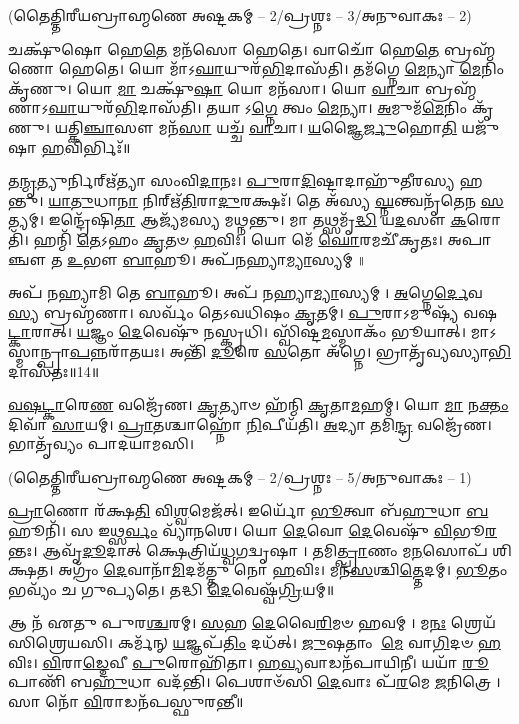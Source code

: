\centerline{\scriptsize (𑌤𑍈𑌤𑍍𑌤𑌿𑌰𑍀𑌯𑌬𑍍𑌰𑌾𑌹𑍍𑌮𑌣𑍇 𑌅𑌷𑍍𑌟𑌕𑌮𑍍 – 2/𑌪𑍍𑌰𑌶𑍍𑌨𑌃 – 3/𑌅𑌨𑍁𑌵𑌾𑌕𑌃 – 2)}
𑌚𑌕𑍍𑌷𑍁᳴𑌷𑍋 𑌹𑍇\-\ul{𑌤𑍇} 𑌮𑌨᳴𑌸𑍋 𑌹𑍇𑌤𑍇।
𑌵𑌾𑌚𑍋᳴ 𑌹𑍇\-\ul{𑌤𑍇} 𑌬𑍍𑌰𑌹𑍍𑌮᳴𑌣𑍋 𑌹𑍇𑌤𑍇।
𑌯𑍋 𑌮𑌾᳴𑌽\-\ul{𑌘𑌾}\-𑌯𑍁𑌰᳴\-\ul{𑌭𑌿}\-𑌦𑌾𑌸᳴𑌤𑌿।
𑌤𑌮᳴𑌗𑍍𑌨𑍇 \ul{𑌮𑍇}\-𑌨𑍍𑌯𑌾 \ul{𑌮𑍇}\-𑌨𑌿𑌂 𑌕𑍃᳴𑌣𑍁।
𑌯𑍋 \ul{𑌮𑌾} 𑌚𑌕𑍍𑌷𑍁᳴\-\ul{𑌷𑌾} 𑌯𑍋 𑌮𑌨᳴𑌸𑌾।
𑌯𑍋 \ul{𑌵𑌾}\-𑌚𑌾 𑌬𑍍𑌰𑌹𑍍𑌮᳴𑌣𑌾𑌽\-\ul{𑌘𑌾}\-𑌯𑍁𑌰᳴\-\ul{𑌭𑌿}\-𑌦𑌾𑌸᳴𑌤𑌿।
𑌤𑌯𑌾𑌽\-\ul{𑌗𑍍𑌨𑍇} 𑌤𑍍𑌵𑌂 \ul{𑌮𑍇}\-𑌨𑍍𑌯𑌾।
\-\ul{𑌅}\-𑌮𑍁𑌮᳴\-\ul{𑌮𑍇}\-𑌨𑌿𑌂 𑌕𑍃᳴𑌣𑍁।
𑌯𑌤𑍍𑌕𑌿\-\ul{𑌞𑍍𑌚𑌾}\-𑌸𑍗 𑌮𑌨᳴\-\ul{𑌸𑌾} 𑌯𑌚𑍍𑌚᳴ \ul{𑌵𑌾}\-𑌚𑌾।
\-\ul{𑌯}\-𑌜𑍍𑌞𑍈\-\ul{𑌰𑍍𑌜𑍁}\-𑌹𑍋\-\ul{𑌤𑌿} 𑌯𑌜𑍁᳴𑌷𑌾 \ul{𑌹}\-𑌵𑌿𑌰𑍍𑌭𑌿𑌃᳴॥

𑌤\-\ul{𑌨𑍍𑌮𑍃}\-𑌤𑍍𑌯𑍁𑌰𑍍𑌨𑌿𑌰𑍍\mbox{}𑌋᳴𑌤𑍍𑌯𑌾 𑌸𑌂𑌵𑌿\-\ul{𑌦𑌾}\-𑌨𑌃।
\-\ul{𑌪𑍁}\-𑌰𑌾\-\ul{𑌦𑌿}\-𑌷𑍍𑌟𑌾𑌦𑌾𑌹𑍁᳴𑌤𑍀𑌰𑌸𑍍𑌯 𑌹𑌨𑍍𑌤𑍁।
\-\ul{𑌯𑌾}\-\-\ul{𑌤𑍁}\-𑌧𑌾\-\ul{𑌨𑌾} 𑌨𑌿𑌰𑍍\mbox{}𑌋᳴\-\ul{𑌤𑌿}\-𑌰𑌾\-\ul{𑌦𑍁}\-𑌰𑌕𑍍𑌷𑌃᳴।
𑌤𑍇 𑌅᳴𑌸𑍍𑌯 \ul{𑌘𑍍𑌨}\-𑌨𑍍𑌤𑍍𑌵𑌨𑍃᳴𑌤𑍇𑌨 \ul{𑌸}\-𑌤𑍍𑌯𑌮𑍍।
𑌇𑌨𑍍𑌦𑍍𑌰𑍇᳴𑌷𑌿\-\ul{𑌤𑌾} 𑌆𑌜𑍍𑌯᳴𑌮𑌸𑍍𑌯 𑌮𑌥𑍍𑌨𑌨𑍍𑌤𑍁।
𑌮𑌾 𑌤𑌥𑍍𑌸𑌮𑍃᳴\-\ul{𑌦𑍍𑌧𑌿} 𑌯\-\ul{𑌦}\-𑌸𑍗 \ul{𑌕}\-𑌰𑍋𑌤𑌿᳴।
𑌹𑌨𑍍𑌮𑌿᳴ \ul{𑌤𑍇}\-𑌽𑌹𑌂 \ul{𑌕𑍃}\-𑌤𑍞 \ul{𑌹}\-𑌵𑌿𑌃।
𑌯𑍋 𑌮𑍇᳴ \ul{𑌘𑍋}\-𑌰𑌮𑌚𑍀᳴𑌕𑍃𑌤𑌃।
𑌅𑌪𑌾𑌞𑍍𑌚𑍗 𑌤 \ul{𑌉}\-𑌭𑍗 \ul{𑌬𑌾}\-𑌹𑍂।
𑌅𑌪᳴𑌨𑌹𑍍𑌯𑌾\-\ul{𑌮𑍍𑌯𑌾}\-𑌸𑍍𑌯𑌮𑍍॥

𑌅𑌪᳴ 𑌨𑌹𑍍𑌯𑌾𑌮𑌿 𑌤𑍇 \ul{𑌬𑌾}\-𑌹𑍂।
𑌅𑌪᳴ 𑌨𑌹𑍍𑌯𑌾\-\ul{𑌮𑍍𑌯𑌾}\-𑌸𑍍𑌯𑌮𑍍।
\-\ul{𑌅}\-𑌗𑍍𑌨𑍇\-\ul{𑌰𑍍𑌦𑍇}\-𑌵\-\ul{𑌸𑍍𑌯} 𑌬𑍍𑌰𑌹𑍍𑌮᳴𑌣𑌾।
𑌸𑌰𑍍𑌵𑌂᳴ 𑌤𑍇𑌽𑌵𑌧𑌿𑌷𑌂 \ul{𑌕𑍃}\-𑌤𑌮𑍍।
\-\ul{𑌪𑍁}\-𑌰𑌾𑌽𑌮𑍁𑌷𑍍𑌯᳴ 𑌵𑌷\-\ul{𑌟𑍍𑌕𑌾}\-𑌰𑌾𑌤𑍍।
\-\ul{𑌯}\-𑌜𑍍𑌞𑌂 \ul{𑌦𑍇}\-𑌵𑍇𑌷𑍁᳴ 𑌨𑌸𑍍𑌕𑍃𑌧𑌿।
𑌸𑍍𑌵𑌿᳴𑌷𑍍𑌟\-\ul{𑌮}\-𑌸𑍍𑌮𑌾𑌕𑌂᳴ 𑌭𑍂𑌯𑌾𑌤𑍍।
𑌮𑌾𑌽𑌸𑍍𑌮𑌾𑌨𑍍𑌪𑍍𑌰𑌾\-\ul{𑌪}\-𑌨𑍍𑌨\-𑌰𑌾᳴𑌤𑌯𑌃।
𑌅𑌨𑍍𑌤𑌿᳴ \ul{𑌦𑍂}\-𑌰𑍇 \ul{𑌸}\-𑌤𑍋 𑌅᳴𑌗𑍍𑌨𑍇।
𑌭𑍍𑌰𑌾𑌤𑍃᳴𑌵𑍍𑌯𑌸𑍍𑌯𑌾\-\ul{𑌭𑌿}\-𑌦𑌾𑌸᳴𑌤𑌃॥14॥

\-\ul{𑌵}\-\-\ul{𑌷}\-\-\ul{𑌟𑍍𑌕𑌾}\-𑌰𑍇\-\ul{𑌣} 𑌵𑌜𑍍𑌰𑍇᳴𑌣।
\-\ul{𑌕𑍃}\-𑌤𑍍𑌯𑌾𑍞 𑌹᳴𑌨𑍍𑌮𑌿 \ul{𑌕𑍃}\-𑌤𑌾\-\ul{𑌮}\-𑌹𑌮𑍍।
𑌯𑍋 \ul{𑌮𑌾} 𑌨\-\ul{𑌕𑍍𑌤𑌂} 𑌦𑌿𑌵𑌾᳴ \ul{𑌸𑌾}\-𑌯𑌮𑍍।
\-\ul{𑌪𑍍𑌰𑌾}\-𑌤𑌶𑍍𑌚𑌾𑌹𑍍𑌨𑍋᳴ \ul{𑌨𑌿}\-𑌪𑍀𑌯᳴𑌤𑌿।
\-\ul{𑌅}\-𑌦𑍍𑌯𑌾 𑌤𑌮𑌿᳴\-\ul{𑌨𑍍𑌦𑍍𑌰} 𑌵𑌜𑍍𑌰𑍇᳴𑌣।
𑌭𑌾𑌤𑍃᳴𑌵𑍍𑌯𑌂 𑌪𑌾𑌦𑌯𑌾𑌮𑌸𑌿।

\centerline{\scriptsize (𑌤𑍈𑌤𑍍𑌤𑌿𑌰𑍀𑌯𑌬𑍍𑌰𑌾𑌹𑍍𑌮𑌣𑍇 𑌅𑌷𑍍𑌟𑌕𑌮𑍍 – 2/𑌪𑍍𑌰𑌶𑍍𑌨𑌃 – 5/𑌅𑌨𑍁𑌵𑌾𑌕𑌃 – 1)}

\-\ul{𑌪𑍍𑌰𑌾}\-𑌣𑍋 𑌰᳴𑌕𑍍𑌷\-\ul{𑌤𑌿} 𑌵𑌿\-\ul{𑌶𑍍𑌵}\-𑌮𑍇𑌜᳴𑌤𑍍।
𑌇𑌰𑍍𑌯𑍋᳴ \ul{𑌭𑍂}\-𑌤𑍍𑌵𑌾 𑌬᳴\-\ul{𑌹𑍁}\-𑌧𑌾 \ul{𑌬}\-𑌹𑍂𑌨𑌿᳴।
𑌸 𑌇𑌥𑍍𑌸\-\ul{𑌰𑍍𑌵𑌂} 𑌵𑍍𑌯𑌾᳴𑌨𑌶𑍇।
𑌯𑍋 \ul{𑌦𑍇}\-𑌵𑍋 \ul{𑌦𑍇}\-𑌵𑍇𑌷𑍁᳴ \ul{𑌵𑌿}\-𑌭𑍂\-\ul{𑌰}\-𑌨𑍍𑌤𑌃।
𑌆𑌵𑍃᳴\-\ul{𑌦𑍂}\-𑌦𑌾𑌤𑍍 𑌕𑍍𑌷𑍇𑌤𑍍𑌰𑌿𑌯᳴\-\ul{𑌧𑍍𑌵}\-𑌗𑌦𑍍𑌵𑍃𑌷𑌾।
𑌤𑌮𑌿\-\ul{𑌤𑍍𑌪𑍍𑌰𑌾}\-𑌣𑌂 𑌮\-\ul{𑌨}\-𑌸𑍋𑌪᳴ 𑌶𑌿𑌕𑍍𑌷𑌤।
𑌅𑌗𑍍𑌰𑌂᳴ \ul{𑌦𑍇}\-𑌵𑌾𑌨𑌾᳴\-\ul{𑌮𑌿}\-𑌦𑌮᳴𑌤𑍍𑌤𑍁 𑌨𑍋 \ul{𑌹}\-𑌵𑌿𑌃।
𑌮𑌨᳴\-\ul{𑌸}\-𑌶𑍍𑌚𑌿\-\ul{𑌤𑍍𑌤𑍇}\-𑌦𑌮𑍍।
\-\ul{𑌭𑍂}\-𑌤𑌂 𑌭𑌵𑍍𑌯𑌂᳴ 𑌚 𑌗𑍁𑌪𑍍𑌯𑌤𑍇।
𑌤𑌦𑍍𑌧𑌿 \ul{𑌦𑍇}\-𑌵𑍇𑌷𑍍𑌵᳴\-\ul{𑌗𑍍𑌰𑌿}\-𑌯𑌮𑍍॥

𑌆 𑌨᳴ 𑌏𑌤𑍁 𑌪𑍁𑌰\-\ul{𑌶𑍍𑌚}\-𑌰𑌮𑍍।
\-\ul{𑌸}\-𑌹 \ul{𑌦𑍇}\-𑌵𑍈\-\ul{𑌰𑌿}\-𑌮𑍞 𑌹𑌵𑌮𑍍।
𑌮\-\ul{𑌨𑌃} 𑌶𑍍𑌰𑍇𑌯᳴𑌸𑌿𑌶𑍍𑌰𑍇𑌯𑌸𑌿।
𑌕𑌰𑍍𑌮᳴𑌨𑍍 \ul{𑌯}\-𑌜𑍍𑌞𑌪᳴\-\ul{𑌤𑌿𑌂} 𑌦𑌧᳴𑌤𑍍।
\-\ul{𑌜𑍁}\-𑌷𑌤𑌾𑌂 \ul{𑌮𑍇} 𑌵𑌾\-\ul{𑌗𑌿}\-𑌦𑍞 \ul{𑌹}\-𑌵𑌿𑌃।
\-\ul{𑌵𑌿}\-𑌰𑌾\-\ul{𑌡𑍍𑌦𑍇}\-𑌵𑍀 \ul{𑌪𑍁}\-𑌰𑍋𑌹𑌿᳴𑌤𑌾।
\-\ul{𑌹}\-\-\ul{𑌵𑍍𑌯}\-𑌵𑌾𑌡𑌨᳴𑌪𑌾𑌯𑌿𑌨𑍀।
𑌯𑌯𑌾᳴ \ul{𑌰𑍂}\-𑌪𑌾𑌣𑌿᳴ 𑌬\-\ul{𑌹𑍁}\-𑌧𑌾 𑌵𑌦᳴𑌨𑍍𑌤𑌿।
𑌪𑍇𑌶𑌾𑍞᳴𑌸𑌿 \ul{𑌦𑍇}\-𑌵𑌾𑌃 𑌪᳴\-\ul{𑌰}\-𑌮𑍇 \ul{𑌜}\-𑌨𑌿𑌤𑍍𑌰𑍇।
𑌸𑌾 𑌨𑍋᳴ \ul{𑌵𑌿}\-𑌰𑌾𑌡𑌨᳴𑌪𑌸𑍍𑌫𑍁𑌰𑌨𑍍𑌤𑍀॥

